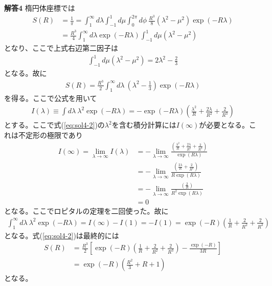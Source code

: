 \documentclass[11pt,pra,aps]{revtex4}
\begin{document}
\noindent
{\bf 解答4}
楕円体座標では
\begin{align}
  S(R)&=\frac{1}{\pi}=\int_1^\infty d\lambda\int_{-1}^{1} d\mu\int^{2\pi}_0d \phi  \ \frac{R^3}{8}(\lambda^2-\mu^2)\exp(-R\lambda)  \nonumber \\
  &=\frac{R^3}{4}\int_1^\infty d\lambda\exp(-R\lambda)\int_{-1}^{1} d\mu (\lambda^2-\mu^2) \label{eq:sol4-1}
\end{align}
となり、ここで上式右辺第二因子は
\begin{align}
  \int_{-1}^{1} d\mu (\lambda^2-\mu^2) = 2\lambda^2-\frac{2}{3}
\end{align}
となる。故に
\begin{align}
  S(R)=\frac{R^3}{2} \int_1^\infty d\lambda \ \left(\lambda^2-\frac{1}{3}\right) \exp(-R\lambda) \label{eq:sol4-2}
\end{align}
を得る。ここで公式を用いて
\begin{align}
  I(\lambda)\equiv\int d\lambda \ \lambda^2 \exp(-R\lambda) = -\exp(-R\lambda)\left(\frac{\lambda^2}{R}+\frac{2\lambda}{R^2}+\frac{2}{R^3}\right)
\end{align}
とする。ここで式(\ref{eq:sol4-2})の$\lambda^2$を含む積分計算には$I(\infty)$が必要となる。これは不定形の極限であり
\begin{align}
  I(\infty)=\lim_{\lambda\rightarrow\infty} I(\lambda)&=-\lim_{\lambda\rightarrow\infty} \frac{\left(\frac{\lambda^2}{R}+\frac{2\lambda}{R^2}+\frac{2}{R^3}\right)}{\exp(R\lambda)} \nonumber \\
  &=-\lim_{\lambda\rightarrow\infty} \frac{\left(\frac{2\lambda}{R}+\frac{2}{R^2}\right)}{R\exp(R\lambda)} \nonumber \\
  &=-\lim_{\lambda\rightarrow\infty} \frac{\left(\frac{2}{R}\right)}{R^2\exp(R\lambda)} \nonumber \\
  &=0
\end{align}  
となる。ここでロピタルの定理を二回使った。故に
\begin{align}
  \int_1^\infty d\lambda \ \lambda^2 \exp(-R\lambda)=I(\infty)-I(1)=-I(1)=\exp(-R)\left(\frac{1}{R}+\frac{2}{R^2}+\frac{2}{R^3}\right)
\end{align}
となる。式(\ref{eq:sol4-2})は最終的には
\begin{align}
  S(R)&=\frac{R^3}{2}\left[\exp(-R)\left(\frac{1}{R}+\frac{2}{R^2}+\frac{2}{R^3}\right) - \frac{\exp(-R)}{3R}\right] \nonumber \\
  &=\exp(-R)\left(\frac{R^2}{3}+R+1\right)
\end{align}
となる。
\end{document}

